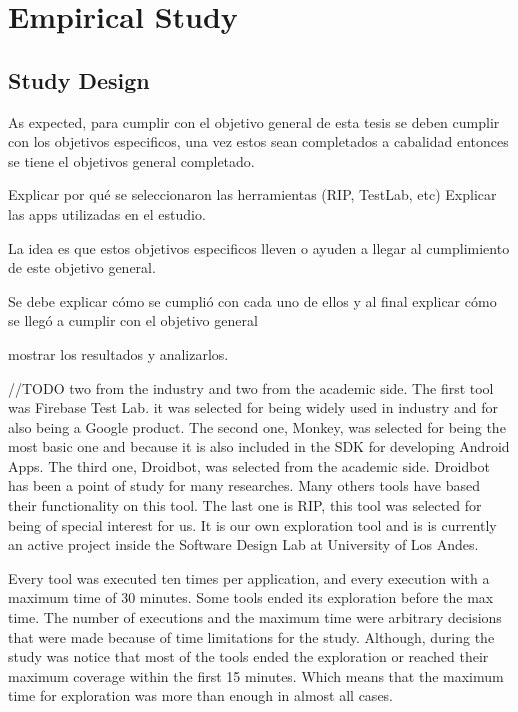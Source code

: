 
\chapter{Empirical Study} %

\label{Chapter4} %

\section{Study Design}

As expected, para cumplir con el objetivo general de esta tesis se deben cumplir con los objetivos especificos, una vez estos sean completados a cabalidad entonces se tiene el objetivos general completado.

Explicar por qué se seleccionaron las herramientas (RIP, TestLab, etc)
Explicar las apps utilizadas en el estudio.

La idea es que estos objetivos especificos lleven o ayuden a llegar al cumplimiento de este objetivo general.

Se debe explicar cómo se cumplió con cada uno de ellos y al final explicar cómo se llegó a cumplir con el objetivo general

mostrar los resultados y analizarlos.

//TODO
two from the industry and two from the academic side. The first tool was Firebase Test Lab. it was selected for being widely used in industry and for also being a Google product. The second one, Monkey, was selected for being the most basic one and because it is also included in the SDK for developing Android Apps. The third one, Droidbot, was selected from the academic side. Droidbot has been a point of study for many researches. Many others tools have based their functionality on this tool. The last one is RIP, this tool was selected for being of special interest for us. It is our own exploration tool and is is currently an active project inside the Software Design Lab at University of Los Andes. 

Every tool was executed ten times per application, and every execution with a maximum time of 30 minutes. Some tools ended its exploration before the max time. 
The number of executions and the maximum time were arbitrary decisions that were made because of time limitations for the study. Although, during the study was notice that most of the tools ended the exploration or reached their maximum coverage within the first 15 minutes. Which means that the maximum time for exploration was more than enough in almost all cases. 
 



